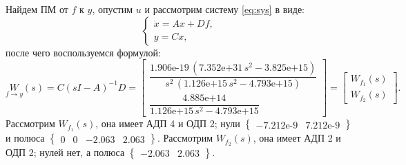 Найдем ПМ от $f$ к $y$, опустим $u$ и рассмотрим систему \eqref{eq:sys} в виде:
\begin{equation*}
    \begin{cases}
        \dot x=Ax+Df,\\
        y=Cx,
    \end{cases}
\end{equation*}
после чего воспользуемся формулой:
\begin{equation*}
    \underset{f\rightarrow y}{W}(s)=C(sI-A)^{-1}D=
    \begin{bmatrix}
\dfrac{\text{1.906e-19}\,{\left(\text{7.352e+31}\,s^2 -\text{3.825e+15}\right)}}{s^2 \,{\left(\text{1.126e+15}\,s^2 -\text{4.793e+15}\right)}}\\[2ex]
\dfrac{\text{4.885e+14}}{\text{1.126e+15}\,s^2 -\text{4.793e+15}}
    \end{bmatrix}=
    \begin{bmatrix}
        W_{f_1}(s)\\W_{f_2}(s)
    \end{bmatrix}.
\end{equation*}
Рассмотрим $W_{f_1}(s)$, она имеет АДП 4 и ОДП 2;
нули $\left\{\begin{array}{cc}
-\text{7.212e-9}&
\text{7.212e-9}
\end{array}\right\}$ и полюса $\left\{\begin{array}{cccc}
0&
0&
-2.063&
2.063
\end{array}\right\}.$
Рассмотрим $W_{f_2}(s)$, она имеет АДП 2 и ОДП 2;
нулей нет, а полюса $\left\{\begin{array}{cc}
-2.063&
2.063
\end{array}\right\}.$

